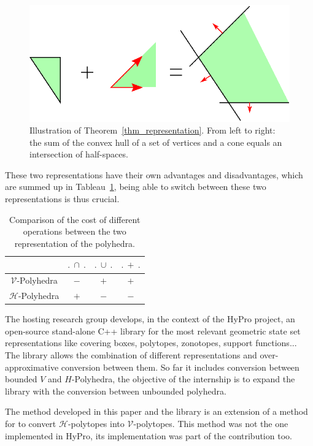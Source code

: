 \begin{figure}
\includegraphics[scale=1]{images/poly.eps}
\caption{Illustration of Theorem~\ref{thm_representation}. From left to right: the sum of the convex hull of a set of vertices and a cone equals an intersection of half-spaces.}
\end{figure}

These two representations have their own advantages and disadvantages, which are summed up  in Tableau~\ref{comparison tab}, being able to switch between these two representations is thus crucial.

\begin{table}
\begin{tabular}{| c | c | c | c |}
	\hline	
				    & $.\ \cap\ .$ & $.\ \cup\ .$ & $.\ +\ .$ \\ \hline
	$\mathcal{V}$-Polyhedra   & $-$ & $+$ & $+$ \\ \hline
   	$\mathcal{H}$-Polyhedra   & $+$ & $-$ & $-$\\ \hline
\end{tabular}
\caption{Comparison of the cost of different operations between the two representation of the polyhedra.}
\label{comparison tab}
\end{table}

The hosting research group develops, in the context of the HyPro project, an open-source stand-alone C++ library for the most relevant geometric state set representations like covering boxes, polytopes, zonotopes, support functions... 
The library allows the combination of different representations and over-approximative conversion between them. So far it includes conversion between bounded $V$ and $H$-Polyhedra, the objective of the internship is to expand the library with the conversion between unbounded polyhedra.

The method developed in this paper and the library is an extension of a method for to convert $\mathcal{H}$-polytopes into $\mathcal{V}$-polytopes. This method was not the one implemented in HyPro, its implementation was part of the contribution too.

